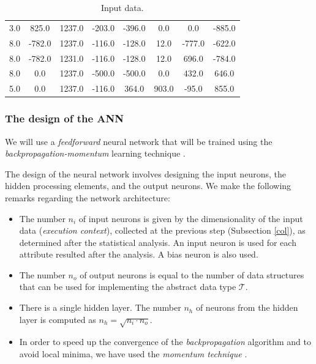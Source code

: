 \begin{table}
\begin{tabular}{|c|c|c|c|c|c|c|c|}
\footnotesize 3.0&\footnotesize 825.0&\footnotesize 1237.0&\footnotesize -203.0&\footnotesize -396.0&\footnotesize 0.0&\footnotesize 0.0&\footnotesize -885.0\\
\footnotesize 8.0&\footnotesize -782.0&\footnotesize 1237.0&\footnotesize -116.0&\footnotesize -128.0&\footnotesize 12.0&\footnotesize -777.0&\footnotesize -622.0\\
\footnotesize 8.0&\footnotesize -782.0&\footnotesize 1231.0&\footnotesize -116.0&\footnotesize -128.0&\footnotesize 12.0&\footnotesize 696.0&\footnotesize -784.0\\
\footnotesize 8.0&\footnotesize 0.0&\footnotesize 1237.0&\footnotesize -500.0&\footnotesize -500.0&\footnotesize 0.0&\footnotesize 432.0&\footnotesize 646.0\\
\footnotesize 5.0&\footnotesize 0.0&\footnotesize 1237.0&\footnotesize -116.0&\footnotesize 364.0&\footnotesize 903.0&\footnotesize -95.0&\footnotesize 855.0\\
\end{tabular}
\caption{Input data.}
\label{input}
\end{table}


\subsubsection{The design of the ANN}

We will use a \emph{feedforward} neural  network  that will be trained using the
\emph{backpropagation}\emph{-momentum} learning technique \cite{Russell02Artificial}.

The design of the neural network involves designing the
input neurons, the hidden processing elements, and the output neurons.
We make the following remarks regarding the network architecture:

\begin{itemize}

\item The number $n_i$ of input neurons is given by the dimensionality of the input data (\emph{execution context}), collected at the previous step (Subsection \ref{col}), as determined after the statistical analysis. An input neuron is used for each attribute resulted after the analysis. A bias neuron is also used.

\item The number $n_o$ of output neurons is equal to the number of data structures that can be used for implementing the abstract data type $\mathcal{T}$.

\item There is a single hidden layer. The number $n_h$ of neurons
from the hidden layer is computed as $n_h=\sqrt{n_i \cdot n_o}$.

\item In order to speed up the convergence of the
\emph{backpropagation}  algorithm and to avoid local minima, we
have used the \emph{momentum technique} \cite{momentum}.

\end{itemize}

